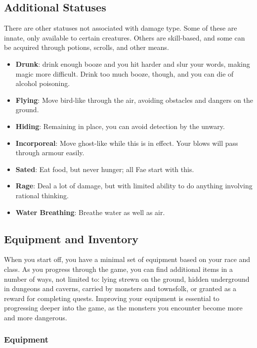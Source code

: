 \subsection{Additional Statuses}

There are other statuses not associated with damage type.  Some of these
are innate, only available to certain creatures.  Others are skill-based, 
and some can be acquired through potions, scrolls, and other means.  

\begin{itemize}
\item{\bf Drunk}: drink enough booze and you hit harder and slur your words,
making magic more difficult.  Drink too much booze, though, and you can die of
alcohol poisoning.
\item{\bf Flying}: Move bird-like through the air, avoiding obstacles and
dangers on the ground.
\item{\bf Hiding}: Remaining in place, you can avoid detection by the unwary.
\item{\bf Incorporeal}: Move ghost-like while this is in effect.  Your blows
will pass through armour easily.
\item{\bf Sated}: Eat food, but never hunger; all Fae start with this.
\item{\bf Rage}: Deal a lot of damage, but with limited ability to do anything
involving rational thinking.
\item{\bf Water Breathing}: Breathe water as well as air.
\end{itemize}

\subsection{Equipment and Inventory}

When you start off, you have a minimal set of equipment based on your race
and class.  As you progress through the game, you can find additional items
in a number of ways, not limited to: lying strewn on the ground, hidden 
underground in dungeons and caverns, carried by monsters and townsfolk, or 
granted as a reward for completing quests.  Improving your equipment is
essential to progressing deeper into the game, as the monsters you encounter
become more and more dangerous.

\subsubsection{Equipment}

